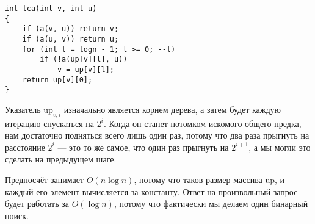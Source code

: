 \begin{verbatim}
int lca(int v, int u)
{
    if (a(v, u)) return v;
    if (a(u, v)) return u;
    for (int l = logn - 1; l >= 0; --l)
        if (!a(up[v][l], u))
            v = up[v][l];
    return up[v][0];
}
\end{verbatim}

Указатель $\mathrm{up}_{v, i}$ изначально является корнем дерева, а затем будет каждую итерацию спускаться на $2^i$. Когда он станет потомком искомого общего предка, нам достаточно подняться всего лишь один раз, потому что два раза прыгнуть на расстояние $2^i$ --- это то же самое, что один раз прыгнуть на $2^{i + 1}$, а мы могли это сделать на предыдущем шаге.

Предпосчёт занимает $O(n\log n)$, потому что таков размер массива $\mathrm{up}$, и каждый его элемент вычисляется за константу. Ответ на произвольный запрос будет работать за $O(\log n)$, потому что фактически мы делаем один бинарный поиск.

